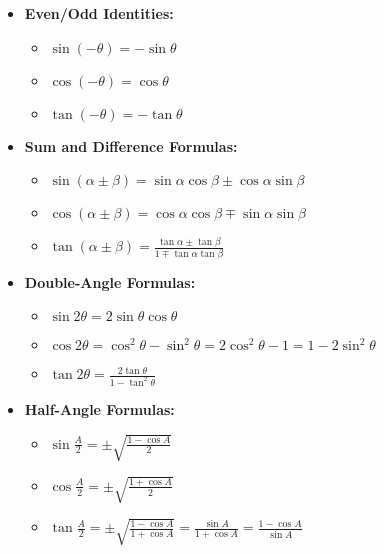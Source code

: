 \documentclass[letterpaper,12pt]{article}
\begin{document}
\begin{itemize}
        \item \textbf{Even/Odd Identities:}
            \begin{itemize}
            \item $\sin (-\theta) = -\sin \theta$
            \item $\cos (-\theta) = \cos \theta$
            \item $\tan (-\theta) = -\tan \theta$
            \end{itemize}
        
        \item \textbf{Sum and Difference Formulas:}
            \begin{itemize}
            \item $\sin (\alpha \pm \beta) = \sin \alpha \cos \beta \pm \cos \alpha \sin \beta$
            \item $\cos (\alpha \pm \beta) = \cos \alpha \cos \beta \mp \sin \alpha \sin \beta$
            \item $\tan (\alpha \pm \beta) = \frac{\tan \alpha \pm \tan \beta}{1 \mp \tan \alpha \tan \beta}$
            \end{itemize}
        
        \item \textbf{Double-Angle Formulas:}
            \begin{itemize}
            \item $\sin 2\theta = 2 \sin \theta \cos \theta$
            \item $\cos 2\theta = \cos^2 \theta - \sin^2 \theta = 2 \cos^2 \theta - 1 = 1 - 2 \sin^2 \theta$
            \item $\tan 2\theta = \frac{2 \tan \theta}{1 - \tan^2 \theta}$
            \end{itemize}
        \item \textbf{Half-Angle Formulas:}
            \begin{itemize}
                \item $\sin \frac{A}{2} = \pm \sqrt{\frac{1 - \cos A}{2}}$
                \item $\cos \frac{A}{2} = \pm \sqrt{\frac{1 + \cos A}{2}}$
                \item $\tan \frac{A}{2} = \pm \sqrt{\frac{1 - \cos A}{1 + \cos A}} = \frac{\sin A}{1 + \cos A} = \frac{1 - \cos A}{\sin A}$
            \end{itemize}


\end{itemize}
\end{document}
